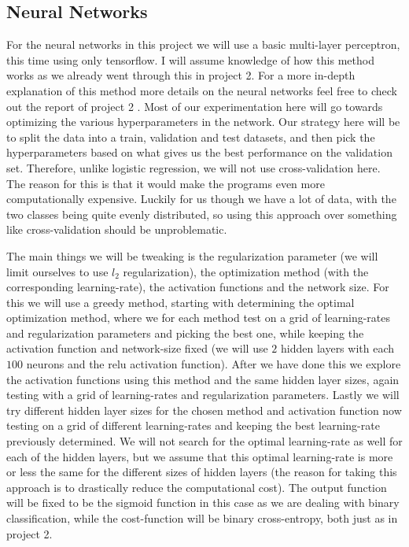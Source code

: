 \documentclass{article}
\begin{document}
\subsection{Neural Networks}
For the neural networks in this project we will use a basic multi-layer
perceptron, this time using only tensorflow. I will assume knowledge of how
this method works as we already went through this in project 2. For a more
in-depth explanation of this method more details on the neural networks feel
free to check out the report of project 2 \cite[s.~3.7]{reportproject2}. Most of
our experimentation here will go towards optimizing the various hyperparameters
in the network. Our strategy here will be to split the data into a train,
validation and test datasets, and then pick the hyperparameters based on what
gives us the best performance on the validation set.  Therefore, unlike logistic
regression, we will not use cross-validation here. The reason for this is that
it would make the programs even more computationally expensive. Luckily for us
though we have a lot of data, with the two classes being quite evenly
distributed, so using this approach over something like cross-validation should
be unproblematic.

The main things we will be tweaking is the regularization parameter (we will
limit ourselves to use $l_2$ regularization), the optimization method (with the
corresponding learning-rate), the activation functions and the network size.
For this we will use a greedy method, starting with determining the optimal
optimization method, where we for each method test on a grid of learning-rates
and regularization parameters and picking the best one, while keeping the
activation function and network-size fixed (we will use $2$ hidden layers with
each $100$ neurons and the relu activation function). After we have done this we
explore the activation functions using this method and the same hidden layer
sizes, again testing with a grid of learning-rates and regularization
parameters. Lastly we will try different hidden layer sizes for the chosen
method and activation function now testing on a grid of different learning-rates
and keeping the best learning-rate previously determined. We will not search for
the optimal learning-rate as well for each of the hidden layers, but we assume
that this optimal learning-rate is more or less the same for the different sizes
of hidden layers (the reason for taking this approach is to drastically reduce
the computational cost).  The output function will be fixed to be the sigmoid
function in this case as we are dealing with binary classification, while the
cost-function will be binary cross-entropy, both just as in project 2.
\end{document}
